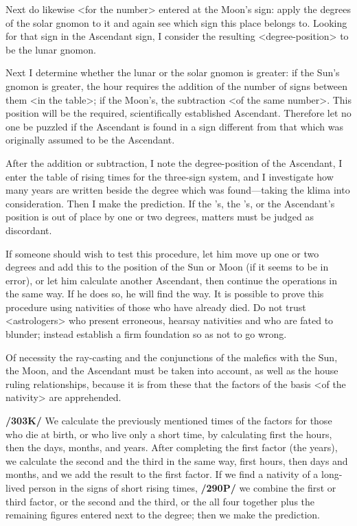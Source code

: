Next do likewise <for the number> entered at the Moon’s sign: apply the degrees of the solar gnomon to it and again see which sign this place belongs to. Looking for that sign in the Ascendant sign, I
consider the resulting <degree-position> to be the lunar gnomon.

Next I determine whether the lunar or the solar gnomon is greater: if the Sun’s gnomon is greater, the hour requires the addition of the number of signs between them <in the table>; if the Moon’s, the
subtraction <of the same number>. This position will be the required, scientifically established Ascendant. Therefore let no one be puzzled if the Ascendant is found in a sign different from that which was originally assumed to be the Ascendant. 

After the addition or subtraction, I note the degree-position of the
Ascendant, I enter the table of rising times for the three-sign system, and I investigate how many years are written beside the degree which was found—taking the klima into consideration. Then I make the
prediction. If the \Sun’s, the \Moon’s, or the Ascendant’s position is out of place by one or two degrees, matters must be judged as discordant.

If someone should wish to test this procedure, let him move up one or two degrees and add this to the position of the Sun or Moon (if it seems to be in error), or let him calculate another Ascendant, then
continue the operations in the same way. If he does so, he will find the way. It is possible to prove this procedure using nativities of those who have already died. Do not trust <astrologers> who present
erroneous, hearsay nativities and who are fated to blunder; instead establish a firm foundation so as not to go wrong.

Of necessity the ray-casting and the conjunctions of the malefics with the Sun, the Moon, and the Ascendant must be taken into account, as well as the house ruling relationships, because it is from these
that the factors of the basis <of the nativity> are apprehended.

\textbf{/303K/} We calculate the previously mentioned times of the factors for those who die at birth, or who live only a short time, by calculating first the hours, then the days, months, and years. After completing the first factor (the years), we calculate the second and the third in the same way, first hours, then days and months, and we add the result to the first factor. If we find a nativity of a long-lived person in the signs of short rising times, \textbf{/290P/} we combine the first or third factor, or the second and the third, or the all four together plus the remaining figures entered next to the degree; then we make the prediction.

